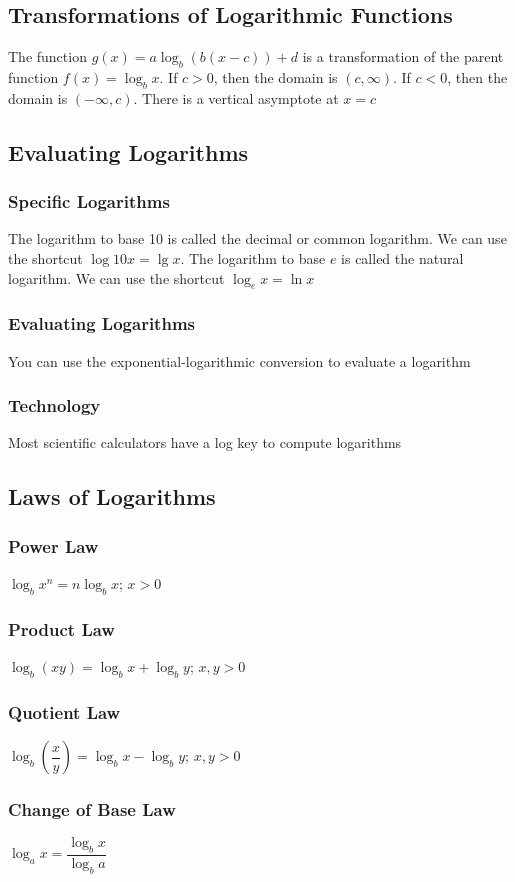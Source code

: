 \documentclass{article}
\begin{document}
	\subsection{Transformations of Logarithmic Functions}
	The function $g(x)=a\log_b(b(x-c))+d$ is a transformation of the parent function $f(x)=\log_bx$. If $c>0$, then the domain is $(c, \infty)$. If $c<0$, then the domain is $(-\infty, c)$. There is a vertical asymptote at $x=c$
	\subsection{Evaluating Logarithms}
	\subsubsection{Specific Logarithms}
	The logarithm to base 10 is called the decimal or common logarithm. We can use the shortcut $\log{10}x=\lg x$. The logarithm to base $e$ is called the natural logarithm. We can use the shortcut $\log_ex=\ln x$
	\subsubsection{Evaluating Logarithms}
	You can use the exponential-logarithmic conversion to evaluate a logarithm
	\subsubsection{Technology}
	Most scientific calculators have a log key to compute logarithms
	\subsection{Laws of Logarithms}
	\subsubsection{Power Law}
	$\log_bx^n=n\log_bx$; $x>0$
	\subsubsection{Product Law}
	$\log_b(xy)=\log_bx+\log_by$; $x,y>0$
	\subsubsection{Quotient Law}
	$\log_b(\dfrac{x}{y})=\log_bx-\log_by$; $x,y>0$
	\subsubsection{Change of Base Law}
	$\log_ax=\dfrac{\log_bx}{\log_ba}$
\end{document}
